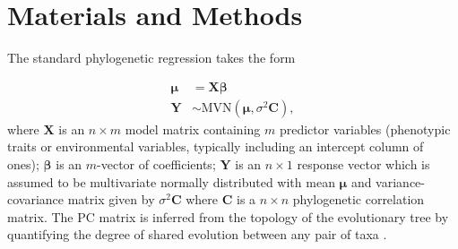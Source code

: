 \documentclass[12pt]{article}
\begin{document}
\section{Materials and Methods}

\newcommand{\bX}{{\mathbf X}}
\newcommand{\bbeta}{{\boldsymbol \beta}}
\newcommand{\bmu}{{\boldsymbol \mu}}
\newcommand{\bY}{{\mathbf Y}}
\newcommand{\bC}{{\mathbf C}}
\newcommand{\bZ}{{\mathbf Z}}
\newcommand{\bb}{{\mathbf b}}
\newcommand{\be}{{\mathbf e}}
\newcommand{\bSigma}{{\boldsymbol \Sigma}}

The standard phylogenetic regression takes the form 


\begin{align}
\bmu & = \bX \bbeta  \label{eq:gls1} \\ 
\bY & \sim \textrm{MVN}(\bmu,\sigma^{2} \bC), \label{eq:gls2}
\end{align}
where $\bX$ is an $n \times m$ model matrix containing $m$ predictor variables (phenotypic traits or environmental variables, typically including an intercept column of ones); $\bbeta$ is an $m$-vector of coefficients; $\bY$ is an $n \times 1$ response vector which is assumed to be multivariate normally distributed with mean $\bmu$ and variance-covariance matrix given by $\sigma^{2} \bC$ where $\bC$ is a $n \times n$ phylogenetic correlation matrix.
The PC matrix is inferred from the topology of the evolutionary tree by quantifying the degree of shared evolution between any pair of taxa \citep{garamszegi2014modern}.

\end{document}
